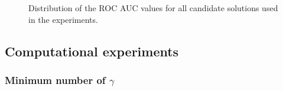 \documentclass[11pt]{article}
\begin{document}
{\begin{figure}[ht!]
\captionsetup{justification=centering}
\caption{Distribution of the ROC AUC values for all candidate solutions used in the experiments.}
\label{fig:boxplot}
\end{figure}

\newpage

\subsection{Computational experiments}

\subsubsection{Minimum number of $\gamma$}

}
\end{document}
